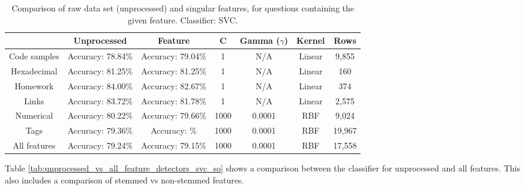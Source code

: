 \begin{table}[!h]%
	\centering
	\begin{tabular}{| c | c | c | c | c | c | c |}
		\hline
		~				& Unprocessed			& Feature						& C				& Gamma ($\gamma$)	& Kernel	& Rows	 		\\ \hline
		Code samples 	& Accuracy: 78.84\%		& Accuracy: 79.04\%				& 1				& N/A				& Linear 	& 9,855 		\\ \hline
		Hexadecimal		& Accuracy: 81.25\%		& Accuracy: 81.25\%				& 1				& N/A				& Linear	& 160 			\\ \hline
		Homework 		& Accuracy: 84.00\%		& Accuracy: 82.67\%				& 1				& N/A				& Linear	& 374 			\\ \hline
		Links			& Accuracy: 83.72\%		& Accuracy: 81.78\%				& 1				& N/A				& Linear	& 2,575			\\ \hline		
		Numerical		& Accuracy: 80.22\%		& Accuracy: 79.66\%				& 1000			& 0.0001			& RBF		& 9,024			\\ \hline
		Tags			& Accuracy: 79.36\%		& Accuracy: \%					& 1000			& 0.0001			& RBF		& 19,967		\\ \hline
		All features	& Accuracy: 79.24\%		& Accuracy: 79.15\%				& 1000 			& 0.0001			& RBF 		& 17,558		\\ \hline
	\end{tabular}
	\caption{Comparison of raw data set (unprocessed) and singular features, for questions containing the given feature. Classifier: SVC.}
	\label{tab:comparison_of_feature_occurences_only}
\end{table}
\vspace{0.5em}\newline
Table \ref{tab:unprocessed_vs_all_feature_detectors_svc_so} shows a comparison between the classifier for unprocessed and all features. 
This also includes a comparison of stemmed vs non-stemmed features. 

